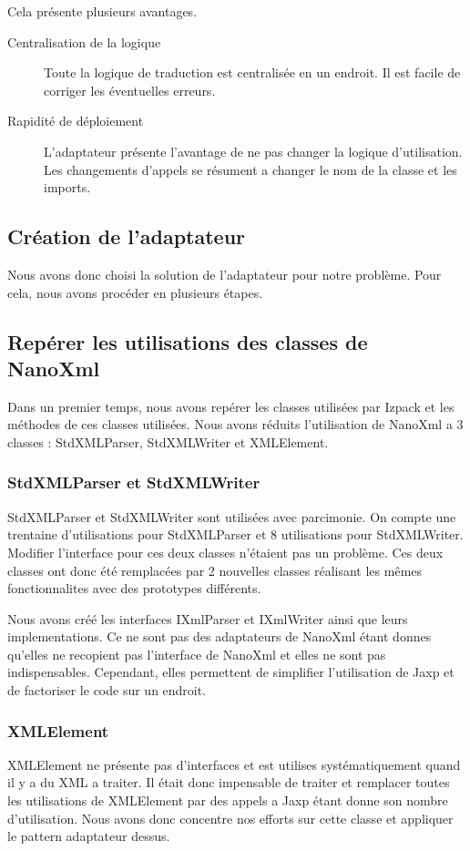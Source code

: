 Cela présente plusieurs avantages.
\begin{description}
\item[Centralisation de la logique] Toute la logique de traduction est centralisée en un endroit. Il est facile de corriger les éventuelles erreurs.
\item[Rapidité de déploiement] L'adaptateur présente l'avantage de ne pas changer la logique d'utilisation. Les changements d'appels se résument a changer le nom de la classe et les imports.
\end{description}
\subsection{Création de l'adaptateur}
Nous avons donc choisi la solution de l'adaptateur pour notre problème. Pour cela, nous avons procéder en plusieurs étapes.
\subsection{Repérer les utilisations des classes de NanoXml}
Dans un premier temps, nous avons repérer les classes utilisées par Izpack et les méthodes de ces classes utilisées. Nous avons réduits l'utilisation de NanoXml a 3 classes : StdXMLParser, StdXMLWriter et XMLElement.
\subsubsection{StdXMLParser et StdXMLWriter}
StdXMLParser et StdXMLWriter sont utilisées avec parcimonie. On compte une trentaine d'utilisations pour StdXMLParser et 8 utilisations pour StdXMLWriter. Modifier l'interface pour ces deux classes n'étaient pas un problème. Ces deux classes ont donc été remplacées par 2 nouvelles classes réalisant les mêmes fonctionnalites avec des prototypes différents.

Nous avons créé les interfaces IXmlParser et IXmlWriter ainsi que leurs implementations. Ce ne sont pas des adaptateurs de NanoXml étant donnes qu'elles ne recopient pas l'interface de NanoXml et elles ne sont pas indispensables. Cependant, elles permettent de simplifier l'utilisation de Jaxp et de factoriser le code sur un endroit.
\subsubsection{XMLElement}
XMLElement ne présente pas d'interfaces et est utilises systématiquement quand il y a du XML a traiter. Il était donc impensable de traiter et remplacer toutes les utilisations de XMLElement par des appels a Jaxp étant donne son nombre d'utilisation. Nous avons donc concentre nos efforts sur cette classe et appliquer le pattern adaptateur dessus.

